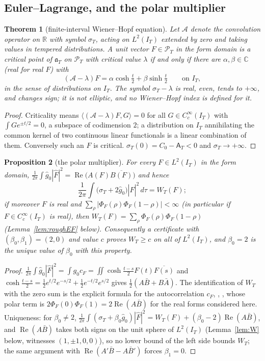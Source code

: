 \documentclass[11pt]{amsart}
\newtheorem{theorem}{Theorem}[section]
\newtheorem{proposition}[theorem]{Proposition}
\theoremstyle{definition}
\theoremstyle{remark}
\newcommand{\C}{\mathbb C}
\newcommand{\R}{\mathbb R}
\newcommand{\Rel}{\operatorname{Re}}
\newcommand{\PT}{\mathcal P_T}
\newcommand{\IT}{I_T}
\newcommand{\sT}{\sigma_T}
\newcommand{\gh}[1]{\widehat g_{#1}}
\newcommand{\Fh}{\widehat F}
\newcommand{\cF}{c_F}
\newcommand{\Aconst}{\mathsf A_T}
\begin{document}
\subsection{Euler--Lagrange, and the polar multiplier}

\begin{theorem}[finite-interval Wiener--Hopf equation]\label{thm:W}
Let $\mathcal A$ denote the convolution operator on $\R$ with symbol $\sT$, acting on
$L^2(\IT)$ extended by zero and taking values in tempered distributions. A unit vector
$F\in\PT$ in the form domain is a critical point of $\mathfrak a_T$ on $\PT$ with critical value
$\lambda$ if and only if there are $\alpha,\beta\in\C$ (real for real $F$) with
\[
(\mathcal A-\lambda)F=\alpha\cosh\tfrac t2+\beta\sinh\tfrac t2\qquad\text{on }\IT,
\]
in the sense of distributions on $\IT$. The symbol $\sT-\lambda$ is real, even, tends to
$+\infty$, and changes sign; it is not elliptic, and no Wiener--Hopf index is defined for it.
\end{theorem}
\begin{proof}
Criticality means $\langle(\mathcal A-\lambda)F,G\rangle=0$ for all $G\in C_c^\infty(\IT)$ with
$\int Ge^{\pm t/2}=0$, a subspace of codimension $2$; a distribution on $\IT$ annihilating the
common kernel of two continuous linear functionals is a linear combination of them. Conversely
such an $F$ is critical. $\sT(0)=C_0-\Aconst<0$ and $\sT\to+\infty$.
\end{proof}

\begin{proposition}[the polar multiplier]\label{prop:P}
For every $F\in L^2(\IT)$ in the form domain,
$\frac1{2\pi}\int\gh0|\Fh|^2=\Rel\big(A(F)\overline{B(F)}\big)$ and hence
\[
\frac1{2\pi}\int\big(\sT+2\gh0\big)|\Fh|^2\,d\tau=W_T(F);
\]
if moreover $F$ is real and $\sum_\rho|\Phi_F(\rho)\Phi_F(1-\rho)|<\infty$ (in particular if
$F\in C_c^\infty(\IT)$ is real), then $W_T(F)=\sum_\rho\Phi_F(\rho)\Phi_F(1-\rho)$
(Lemma~\ref{lem:roughEF} below).
Consequently a certificate with $(\beta_0,\beta_1)=(2,0)$ and value $c$ proves $W_T\ge c$ on all
of $L^2(\IT)$, and $\beta_0=2$ is the unique value of $\beta_0$ with this property.
\end{proposition}
\begin{proof}
$\frac1{2\pi}\int\gh0|\Fh|^2=\int g_0\cF=\iint\cosh\frac{t-s}2F(t)\overline{F(s)}$ and
$\cosh\frac{t-s}2=\frac12e^{t/2}e^{-s/2}+\frac12e^{-t/2}e^{s/2}$ gives $\frac12(A\bar B+B\bar A)$.
The identification of $W_T$ with the zero sum is the explicit formula for the autocorrelation
$\cF$, \cite{Weil52,Bombieri2000}, \cite[Thm.~8.4]{Paper45}, whose polar term is
$2\Phi_F(0)\Phi_F(1)=2\Rel(A\bar B)$ for the real forms considered here. Uniqueness: for
$\beta_0\ne2$, $\frac1{2\pi}\int(\sT+\beta_0\gh0)|\Fh|^2=W_T(F)+(\beta_0-2)\Rel(A\bar B)$, and
$\Rel(A\bar B)$ takes both signs on the unit sphere of $L^2(\IT)$ (Lemma~\ref{lem:W} below, witnesses
$(1,\pm1,0,0)$), so no lower bound of the left side bounds $W_T$; the same argument with
$\Rel(A'\bar B-A\bar B')$ forces $\beta_1=0$.
\end{proof}
\end{document}
